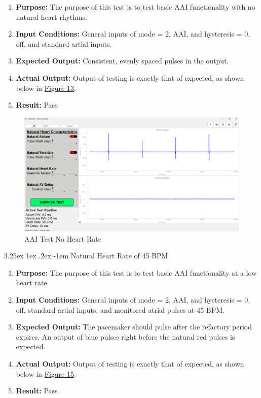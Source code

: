\documentclass{article}
\makeatletter
\renewcommand\paragraph{\@startsection{paragraph}{5}{\z@}%
  {3.25ex \@plus1ex \@minus.2ex}%
  {-1em}%
  {\normalfont\normalsize\bfseries}}
\makeatother
\begin{document}
\begin{enumerate}[label=]
   \item \textbf{Purpose:} The purpose of this test is to test basic AAI functionality with no natural heart rhythms.
   \item \textbf{Input Conditions:} General inputs of mode = 2, AAI, and hysteresis = 0, off, and standard 
   artial inputs. 
   \item \textbf{Expected Output:} Consistent, evenly spaced pulses in the output.
   \item \textbf{Actual Output:} Output of testing is exactly that of expected, as shown below in \hyperref[AAItestnohr]{Figure 13}.
   \item \textbf{Result:} Pass
\end{enumerate}

\begin{tcolorbox}
    \begin{figure}[H]
        \label{AAItestnohr}
        \includegraphics[width=\textwidth]{AAItestnohr.png}
        \caption{AAI Test No Heart Rate}
    \end{figure}
\end{tcolorbox}

\newpage
\paragraph{Natural Heart Rate of 45 BPM}

\begin{enumerate}[label=]
   \item \textbf{Purpose:} The purpose of this test is to test basic AAI functionality at a low heart rate.
   \item \textbf{Input Conditions:} General inputs of mode = 2, AAI, and hysteresis = 0, off, standard 
   artial inputs, and monitored atrial pulses at 45 BPM.
   \item \textbf{Expected Output:} The pacemaker should pulse after the refactory period expires. An output of blue pulses right before the natural 
   red pulses is expected.
   \item \textbf{Actual Output:} Output of testing is exactly that of expected, as shown below in \hyperref[AAItest45]{Figure 15}.
   \item \textbf{Result:} Pass
\end{enumerate}
\end{document}
